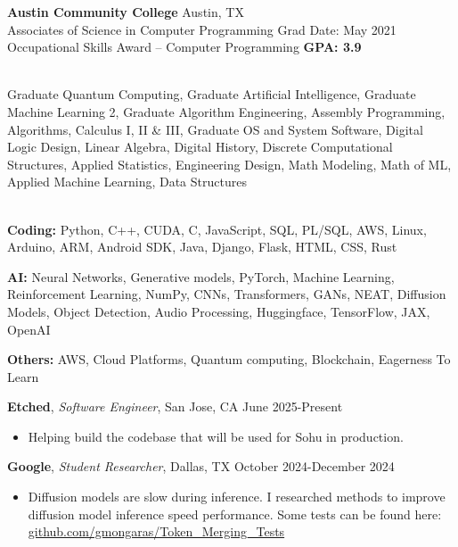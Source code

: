\documentclass[a4paper,10pt]{article}
\begin{document}
\vspace{5pt}
\noindent\textbf{Austin Community College} \hfill Austin, TX \\
Associates of Science in Computer Programming \hfill Grad Date: May 2021 \\
Occupational Skills Award – Computer Programming \hfill \textbf{GPA: 3.9}

\vspace{5pt}
 \\
Graduate Quantum Computing, Graduate Artificial Intelligence, Graduate Machine Learning 2, Graduate Algorithm Engineering, Assembly Programming, Algorithms, Calculus I, II \& III, Graduate OS and System Software, Digital Logic Design, Linear Algebra, Digital History, Discrete Computational Structures, Applied Statistics, Engineering Design, Math Modeling, Math of ML, Applied Machine Learning, Data Structures


\vspace{5pt}
 \vspace{1pt} \\
\textbf{Coding:} Python, C++, CUDA, C, JavaScript, SQL, PL/SQL, AWS, Linux, Arduino, ARM, Android SDK, Java, Django, Flask, HTML, CSS, Rust

\noindent\textbf{AI:} Neural Networks, Generative models, PyTorch, Machine Learning, Reinforcement Learning, NumPy, CNNs, Transformers, GANs, NEAT, Diffusion Models, Object Detection, Audio Processing, Huggingface, TensorFlow, JAX, OpenAI

\noindent\textbf{Others:} AWS, Cloud Platforms, Quantum computing, Blockchain, Eagerness To Learn







\vspace{5pt}
 \vspace{1pt}

\noindent\textbf{Etched}, \textit{Software Engineer}, San Jose, CA \hfill June 2025-Present
\begin{itemize}[noitemsep,topsep=0pt]
  \item Helping build the codebase that will be used for Sohu in production.
\end{itemize}

\noindent\textbf{Google}, \textit{Student Researcher}, Dallas, TX \hfill October 2024-December 2024
\begin{itemize}[noitemsep,topsep=0pt]
  \item Diffusion models are slow during inference. I researched methods to improve diffusion model inference speed performance. Some tests can be found here: \href{https://github.com/gmongaras/Token_Merging_Tests}{github.com/gmongaras/Token\_Merging\_Tests}
\end{itemize}
\end{document}
